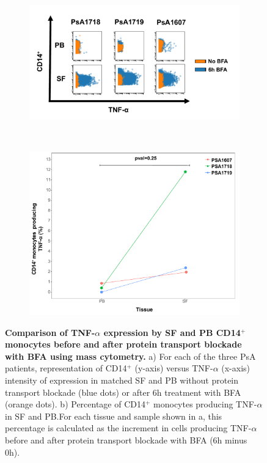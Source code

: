 \bigskip
\begin{figure}[H]
\centering
\begin{subfigure}[b]{0.6\textwidth}
\centering 
\includegraphics[width=\textwidth]{./Results3/pdfs/PSA_0h_6h_BFA_TNFa_mass_cytometry_PSA1718_PSA1719_PSA1607}
\caption{}
\end{subfigure}
~
\begin{subfigure}[b]{0.45\textwidth} 
\centering
\includegraphics[width=\textwidth]{./Results3/pdfs/CyTOF_PSA1607_PSA1718_PSA1719_TNFa_percentage}
\caption{}
\end{subfigure}
\caption[Comparison of TNF-$\alpha$ expression in SF and PB CD14$^+$ monocytes before and after protein transport blockade with BFA using mass cytometry.]{\textbf{Comparison of TNF-$\alpha$ expression by SF and PB CD14$^+$ monocytes before and after protein transport blockade with BFA using mass cytometry.} a) For each of the three PsA patients, representation of CD14$^+$ (y-axis) versus TNF-$\alpha$ (x-axis) intensity of expression in matched SF and PB without protein transport blockade (blue dots) or after 6h treatment with BFA (orange dots). b) Percentage of CD14$^+$ monocytes producing TNF-$\alpha$ in SF and PB.For each tissue and sample shown in a, this percentage is calculated as the increment in cells producing TNF-$\alpha$ before and after protein transport blockade with BFA (6h minus 0h).}
\label{figure:PsA_monocytes_percentage_TNFa}
\end{figure}



